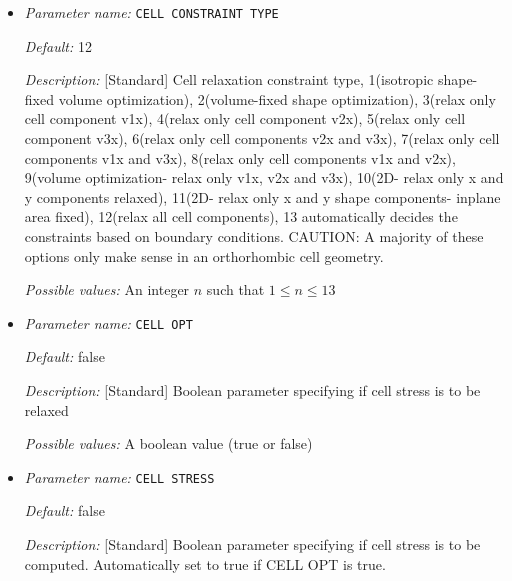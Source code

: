 \begin{itemize}
\item {\it Parameter name:} {\tt CELL CONSTRAINT TYPE}
\label{parameters:Geometry/Optimization/CELL CONSTRAINT TYPE}
\label{parameters:Geometry/Optimization/CELL_20CONSTRAINT_20TYPE}




{\it Default:} 12


{\it Description:} [Standard] Cell relaxation constraint type, 1(isotropic shape-fixed volume optimization), 2(volume-fixed shape optimization), 3(relax only cell component v1x), 4(relax only cell component v2x), 5(relax only cell component v3x), 6(relax only cell components v2x and v3x), 7(relax only cell components v1x and v3x), 8(relax only cell components v1x and v2x), 9(volume optimization- relax only v1x, v2x and v3x), 10(2D- relax only x and y components relaxed), 11(2D- relax only x and y shape components- inplane area fixed), 12(relax all cell components), 13 automatically decides the constraints based on boundary conditions. CAUTION: A majority of these options only make sense in an orthorhombic cell geometry.


{\it Possible values:} An integer $n$ such that $1\leq n \leq 13$
\item {\it Parameter name:} {\tt CELL OPT}
\label{parameters:Geometry/Optimization/CELL OPT}
\label{parameters:Geometry/Optimization/CELL_20OPT}




{\it Default:} false


{\it Description:} [Standard] Boolean parameter specifying if cell stress is to be relaxed


{\it Possible values:} A boolean value (true or false)
\item {\it Parameter name:} {\tt CELL STRESS}
\label{parameters:Geometry/Optimization/CELL STRESS}
\label{parameters:Geometry/Optimization/CELL_20STRESS}




{\it Default:} false


{\it Description:} [Standard] Boolean parameter specifying if cell stress is to be computed. Automatically set to true if CELL OPT is true.



\end{itemize}
